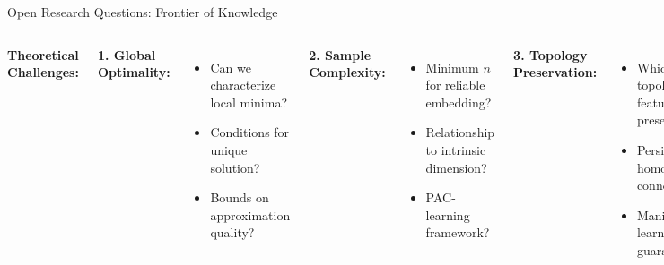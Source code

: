 \documentclass[aspectratio=169]{beamer}
\begin{document}
\begin{frame}{Open Research Questions: Frontier of Knowledge}
\begin{columns}
\textbf{Theoretical Challenges:}

\textbf{1. Global Optimality:}
\begin{itemize}
\item Can we characterize local minima?
\item Conditions for unique solution?
\item Bounds on approximation quality?
\end{itemize}

\textbf{2. Sample Complexity:}
\begin{itemize}
\item Minimum $n$ for reliable embedding?
\item Relationship to intrinsic dimension?
\item PAC-learning framework?
\end{itemize}

\textbf{3. Topology Preservation:}
\begin{itemize}
\item Which topological features preserved?
\item Persistent homology connections?
\item Manifold learning guarantees?
\end{itemize}

\textbf{4. Information Theory:}
\begin{itemize}
\item Optimal kernel choice?
\item Rate-distortion bounds?
\item Connection to mutual information?
\end{itemize}

\textbf{Algorithmic Frontiers:}

\textbf{1. Linear-Time Exact:}
\begin{itemize}
\item Can we achieve $O(n)$ without approximation?
\item Better data structures?
\item Quantum algorithms?
\end{itemize}

\textbf{2. Online Learning:}
\begin{itemize}
\item Truly incremental t-SNE?
\item Streaming data handling?
\item Concept drift adaptation?
\end{itemize}


\end{columns}
\end{frame}
\end{document}
